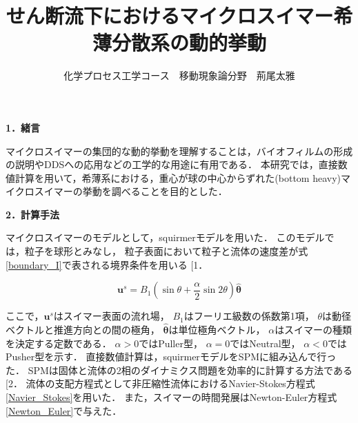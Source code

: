 \documentclass[twocolumns,10pt,a4j]{jarticle}
\title{\Large せん断流下におけるマイクロスイマー希薄分散系の動的挙動\vspace{-3truemm}}
\author{\large 化学プロセス工学コース　移動現象論分野　荊尾太雅\vspace{-10zh}}
\date{}
\makeatletter
\DeclareRobustCommand\cite{\unskip
  \@ifnextchar[{\@tempswatrue\@citex}{\@tempswafalse\@citex[]}}
\makeatother
\begin{document}



  \noindent
  \textbf{\large 1．緒言}
  \par
マイクロスイマーの集団的な動的挙動を理解することは，バイオフィルムの形成の説明やDDSへの応用などの工学的な用途に有用である．
本研究では，直接数値計算を用いて，希薄系における，重心が球の中心からずれた(bottom heavy)マイクロスイマーの挙動を調べることを目的とした．


  \vspace{0.5truemm}
  \noindent
  \textbf{\large 2．計算手法}
  \par
マイクロスイマーのモデルとして，squirmerモデルを用いた．
このモデルでは，粒子を球形とみなし，
粒子表面において粒子と流体の速度差が式\eqref{boundary_I}で表される境界条件を用いる\cite{1}．

  \vspace{-3truemm}
    \begin{equation}
      \boldsymbol{u}^s = B_1 \left( \sin{\theta} + \frac{\alpha}{2} \sin{2\theta} \right) \hat{\boldsymbol{\theta}}
      \label{boundary_I}
    \end{equation}
  \vspace{-4truemm}

  \noindent
ここで，$\boldsymbol{u}^s$はスイマー表面の流れ場，
$B_1$はフーリエ級数の係数第1項，
$\theta$は動径ベクトルと推進方向との間の極角，
$\hat{\boldsymbol{\theta}}$は単位極角ベクトル，
$\alpha$はスイマーの種類を決定する定数である．
$\alpha>0$ではPuller型，
$\alpha=0$ではNeutral型，
$\alpha<0$ではPusher型を示す．
直接数値計算は，squirmerモデルをSPMに組み込んで行った．
SPMは固体と流体の2相のダイナミクス問題を効率的に計算する方法である\cite{2}．
流体の支配方程式として非圧縮性流体におけるNavier-Stokes方程式\eqref{Navier_Stokes}を用いた．
また，スイマーの時間発展はNewton-Euler方程式\eqref{Newton_Euler}で与えた．
\end{document}
